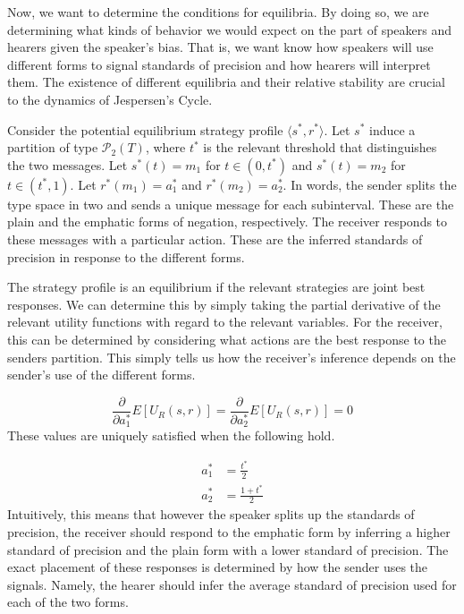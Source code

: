 Now, we want to determine the conditions for equilibria. By doing so, we are determining what kinds of behavior we would expect on the part of speakers and hearers given the speaker's bias. That is, we want know how speakers will use different forms to signal standards of precision and how hearers will interpret them. The existence of different equilibria and their relative stability are crucial to the dynamics of Jespersen's Cycle.

Consider the potential equilibrium strategy profile $\langle s^*, r^* \rangle$. Let $s^*$ induce a partition of type $\mathcal{P}_2(T)$, where $t^*$ is the relevant threshold that distinguishes the two messages. Let $s^*(t) = m_1$ for $t \in (0,t^*)$ and $s^*(t) = m_2$ for $t \in (t^*,1)$. Let $r^*(m_1) = a_1^*$ and $r^*(m_2) = a_2^*$. In words, the sender splits the type space in two and sends a unique message for each subinterval. These are the plain and the emphatic forms of negation, respectively. The receiver responds to these messages with a particular action.  These are the inferred standards of precision in response to the different forms.

The strategy profile is an equilibrium if the relevant strategies are joint best responses. We can determine this by simply taking the partial derivative of the relevant utility functions with regard to the relevant variables. For the receiver, this can be determined by considering what actions are the best response to the senders partition. This simply tells us how the receiver's inference depends on the sender's use of the different forms.

\begin{equation}
\frac{\partial}{\partial a_1^*}E[U_R(s, r)] = \frac{\partial}{\partial a_2^*}E[U_R(s, r)] = 0
\end{equation}
These values are uniquely satisfied when the following hold.

\begin{equation}
     \begin{split}
	  a_1^* &= \frac{t^*}{2}\\
	  a_2^* &= \frac{1 + t^*}{2}
     \end{split}
\end{equation}
Intuitively, this means that however the speaker splits up the standards of precision, the receiver should respond to the emphatic form by inferring a higher standard of precision and the plain form with a lower standard of precision. The exact placement of these responses is determined by how the sender uses the signals. Namely, the hearer should infer the average standard of precision used for each of the two forms.

